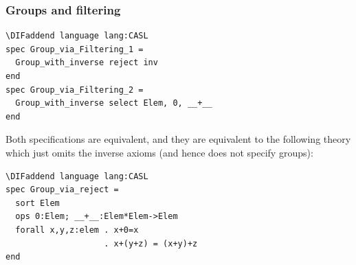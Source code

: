 \documentclass[10pt,fleqn,final]{scrreprt}
\newcommand{\sssclause}[1]{\subsubsection{#1}}
\providecommand{\DIFaddbegin}{} %
\providecommand{\DIFaddend}{} %
\providecommand{\DIFdelbegin}{} %
\providecommand{\DIFdelend}{} %
\begin{document}
\sssclause{Groups and filtering}\DIFdelbegin %
\DIFdelend \DIFaddbegin \label{ex:reject}
\begin{lstlisting}[basicstyle=\ttfamily,language=dolText,alsolanguage=CASL,escapechar=@,mathescape]
\DIFaddend language lang:CASL
spec Group_via_Filtering_1 =
  Group_with_inverse reject inv
end
spec Group_via_Filtering_2 =
  Group_with_inverse select Elem, 0, __+__
end
\end{lstlisting}
Both specifications are equivalent, and they are equivalent 
to the following theory which just omits the inverse
axioms (and hence does not specify groups):
\DIFdelbegin %
\DIFdelend \DIFaddbegin \begin{lstlisting}[basicstyle=\ttfamily,language=dolText,alsolanguage=CASL,escapechar=@,mathescape]
\DIFaddend language lang:CASL
spec Group_via_reject =
  sort Elem
  ops 0:Elem; __+__:Elem*Elem->Elem
  forall x,y,z:elem . x+0=x
                    . x+(y+z) = (x+y)+z
end
\end{lstlisting}
\end{document}
